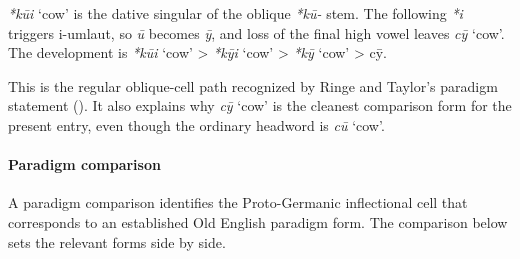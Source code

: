 \documentclass[
  british,
  a4paper,
]{article}
\providecommand{\Recon}[1]{\emph{*#1}}
\begin{document}
\Recon{kūi} `cow' is the dative singular of the oblique \emph{*kū-}
stem. The following \emph{*i} triggers i-umlaut, so \emph{ū} becomes
\emph{ȳ}, and loss of the final high vowel leaves {\emph{cȳ}} `cow'. The
development is \Recon{kūi} `cow' \textgreater{} \Recon{kȳi} `cow'
\textgreater{} \Recon{kȳ} `cow' \textgreater{} cȳ.

This is the regular oblique-cell path recognized by Ringe and Taylor's
paradigm statement (). It also explains why {\emph{cȳ}} `cow' is the
cleanest comparison form for the present entry, even though the ordinary
headword is {\emph{cū}} `cow'.

\paragraph{Paradigm comparison}\label{paradigm-comparison-6}

A paradigm comparison identifies the Proto-Germanic inflectional cell
that corresponds to an established Old English paradigm form. The
comparison below sets the relevant forms side by side.
\end{document}
